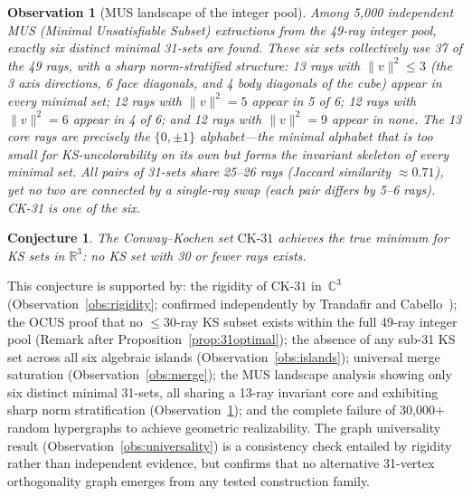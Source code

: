 \documentclass[12pt,a4paper]{article}
\newtheorem{conjecture}[theorem]{Conjecture}
\newtheorem{observation}[theorem]{Observation}
\newcommand{\R}{\mathbb{R}}
\newcommand{\C}{\mathbb{C}}
\newcommand{\CK}{\mathrm{CK}\text{-}31}
\begin{document}
\begin{observation}[MUS landscape of the integer pool]\label{obs:mus-landscape}
Among 5{,}000 independent MUS (Minimal Unsatisfiable Subset) extractions from the 49-ray integer pool, exactly \emph{six} distinct minimal 31-sets are found.  These six sets collectively use 37 of the 49 rays, with a sharp norm-stratified structure: 13 rays with $\|v\|^2 \leq 3$ (the 3 axis directions, 6 face diagonals, and 4 body diagonals of the cube) appear in \emph{every} minimal set; 12 rays with $\|v\|^2 = 5$ appear in 5 of 6; 12 rays with $\|v\|^2 = 6$ appear in 4 of 6; and 12 rays with $\|v\|^2 = 9$ appear in \emph{none}.  The 13 core rays are precisely the $\{0, \pm 1\}$ alphabet---the minimal alphabet that is too small for KS-uncolorability on its own but forms the invariant skeleton of every minimal set.  All pairs of 31-sets share 25--26 rays (Jaccard similarity $\approx 0.71$), yet no two are connected by a single-ray swap (each pair differs by 5--6 rays).  CK-31 is one of the six.
\end{observation}

\begin{conjecture}\label{conj:optimal}
The Conway--Kochen set $\CK$ achieves the true minimum for KS sets in $\R^3$: no KS set with 30 or fewer rays exists.
\end{conjecture}

This conjecture is supported by: the rigidity of $\CK$ in~$\C^3$ (Observation~\ref{obs:rigidity}; confirmed independently by Trandafir and Cabello~\cite{TrandafirCabello2025}); the OCUS proof that no $\leq 30$-ray KS subset exists within the full 49-ray integer pool (Remark after Proposition~\ref{prop:31optimal}); the absence of any sub-31 KS set across all six algebraic islands (Observation~\ref{obs:islands}); universal merge saturation (Observation~\ref{obs:merge}); the MUS landscape analysis showing only six distinct minimal 31-sets, all sharing a 13-ray invariant core and exhibiting sharp norm stratification (Observation~\ref{obs:mus-landscape}); and the complete failure of 30{,}000+ random hypergraphs to achieve geometric realizability.  The graph universality result (Observation~\ref{obs:universality}) is a consistency check entailed by rigidity rather than independent evidence, but confirms that no alternative 31-vertex orthogonality graph emerges from any tested construction family.
\end{document}
